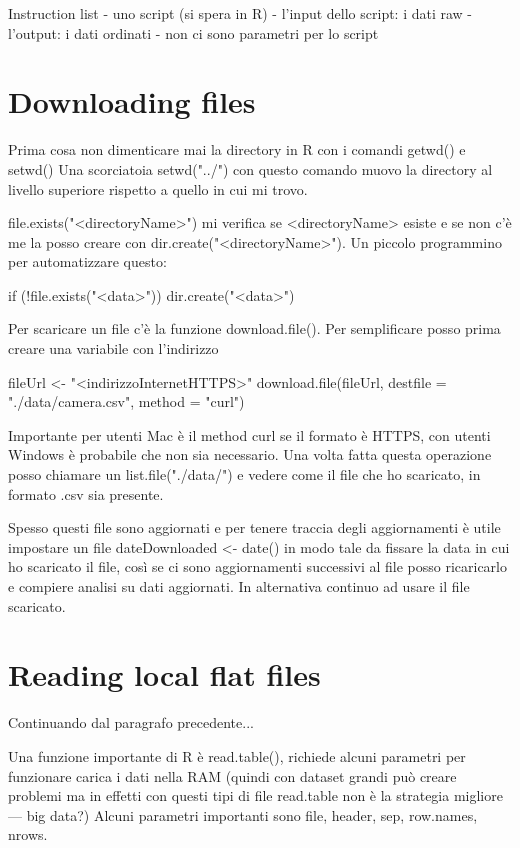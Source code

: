 Instruction list 
- uno script (si spera in R)
- l'input dello script: i dati raw
- l'output: i dati ordinati
- non ci sono parametri per lo script


\section{Downloading files}

Prima cosa non dimenticare mai la directory in R con i comandi getwd() e setwd()
Una scorciatoia setwd("../") con questo comando muovo la directory al livello superiore
rispetto a quello in cui mi trovo.

file.exists("<directoryName>") mi verifica se <directoryName> esiste e se non c'è me la
posso creare con dir.create("<directoryName>").
Un piccolo programmino per automatizzare questo:

if (!file.exists("<data>")) {
	dir.create("<data>")
}

Per scaricare un file c'è la funzione download.file().
Per semplificare posso prima creare una variabile con l'indirizzo

fileUrl <- "<indirizzoInternetHTTPS>"
download.file(fileUrl, destfile = "./data/camera.csv", method = "curl")

Importante per utenti Mac è il method curl se il formato è HTTPS, con utenti Windows è probabile che non sia
necessario.
Una volta fatta questa operazione posso chiamare un list.file("./data/") e vedere come 
il file che ho scaricato, in formato .csv sia presente.

Spesso questi file sono aggiornati e per tenere traccia degli aggiornamenti è utile
impostare un file dateDownloaded <- date() in modo tale da fissare la data in cui
ho scaricato il file, così se ci sono aggiornamenti successivi al file posso ricaricarlo
e compiere analisi su dati aggiornati. In alternativa continuo ad usare il file scaricato.


\section{Reading local flat files}


Continuando dal paragrafo precedente...

Una funzione importante di R è read.table(), richiede alcuni parametri per funzionare
carica i dati nella RAM (quindi con dataset grandi può creare problemi ma in effetti con questi tipi di file read.table non è la strategia migliore --- big data?)
Alcuni parametri importanti sono file, header, sep, row.names, nrows.

